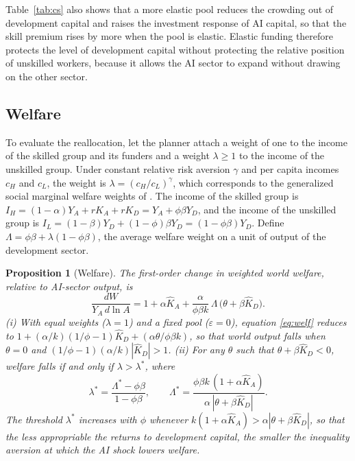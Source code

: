 \documentclass[AER]{AEA}
\newtheorem{proposition}{Proposition}
\begin{document}
Table~\ref{tab:cs} also shows that a more elastic pool reduces the crowding out of development capital and raises the investment response of AI capital, so that the skill premium rises by more when the pool is elastic. Elastic funding therefore protects the level of development capital without protecting the relative position of unskilled workers, because it allows the AI sector to expand without drawing on the other sector.

\subsection{Welfare}

To evaluate the reallocation, let the planner attach a weight of one to the income of the skilled group and its funders and a weight $\lambda\ge1$ to the income of the unskilled group. Under constant relative risk aversion $\gamma$ and per capita incomes $c_H$ and $c_L$, the weight is $\lambda=(c_H/c_L)^{\gamma}$, which corresponds to the generalized social marginal welfare weights of \citet{SaezStantcheva2016}. The income of the skilled group is $I_H=(1-\alpha)Y_A+rK_A+rK_D=Y_A+\phi\beta Y_D$, and the income of the unskilled group is $I_L=(1-\beta)Y_D+(1-\phi)\beta Y_D=(1-\phi\beta)Y_D$. Define $\Lambda=\phi\beta+\lambda(1-\phi\beta)$, the average welfare weight on a unit of output of the development sector.

\begin{proposition}[Welfare]\label{prop:welf}
The first-order change in weighted world welfare, relative to AI-sector output, is
\begin{equation}\label{eq:welf}
\frac{dW}{Y_A\,d\ln A}=1+\alpha\hat{K}_A+\frac{\alpha}{\phi\beta k}\,\Lambda\,\bigl(\theta+\beta\hat{K}_D\bigr).
\end{equation}
(i) With equal weights ($\lambda=1$) and a fixed pool ($\varepsilon=0$), equation \eqref{eq:welf} reduces to $1+(\alpha/k)(1/\phi-1)\hat{K}_D+(\alpha\theta/\phi\beta k)$, so that world output falls when $\theta=0$ and $(1/\phi-1)(\alpha/k)|\hat{K}_D|>1$. (ii) For any $\theta$ such that $\theta+\beta\hat{K}_D<0$, welfare falls if and only if $\lambda>\lambda^{*}$, where
\begin{equation}\label{eq:lamstar}
\lambda^{*}=\frac{\Lambda^{*}-\phi\beta}{1-\phi\beta},\qquad
\Lambda^{*}=\frac{\phi\beta k\,(1+\alpha\hat{K}_A)}{\alpha\,|\theta+\beta\hat{K}_D|} .
\end{equation}
The threshold $\lambda^{*}$ increases with $\phi$ whenever $k(1+\alpha\hat{K}_A)>\alpha|\theta+\beta\hat{K}_D|$, so that the less appropriable the returns to development capital, the smaller the inequality aversion at which the AI shock lowers welfare.
\end{proposition}
\end{document}
